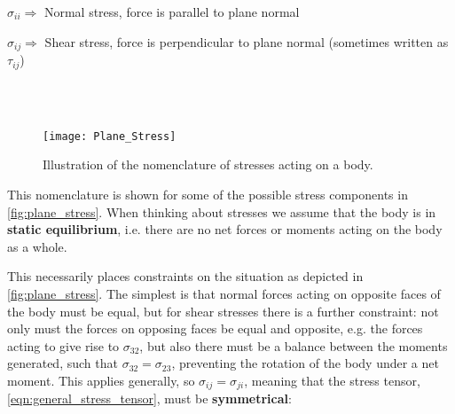 \begin{annotation}
$\sigma_{ii} \Longrightarrow $ Normal stress, force is parallel to plane normal

$\sigma_{ij} \Longrightarrow $ Shear stress, force is perpendicular to plane normal (sometimes written as $\tau_{ij}$)
\end{annotation}
\\
\\




\begin{figure}[bh!]
\centering
\texttt{[image: Plane\_Stress]}
\caption{Illustration of the nomenclature of stresses acting on a body.\label{fig:plane_stress} }
\end{figure}

This nomenclature is shown for some of the possible stress components in \autoref{fig:plane_stress}. When thinking about stresses we assume that the body is in {\bf static equilibrium}, i.e. there are no net forces or moments acting on the body as a whole. 

This necessarily places constraints on the situation as depicted in \autoref{fig:plane_stress}. The simplest is that normal forces acting on opposite faces of the body must be equal, but for shear stresses there is a further constraint: not only must the forces on opposing faces be equal and opposite, e.g. the forces acting to give rise to $\sigma_{32}$, but also there must be a balance between the moments generated, such that $\sigma_{32} = \sigma_{23}$, preventing the rotation of the body under a net moment. This applies generally, so $\sigma_{ij} = \sigma_{ji}$, meaning that the stress tensor, \autoref{eqn:general_stress_tensor}, must be {\bf symmetrical}:
\\
\\

